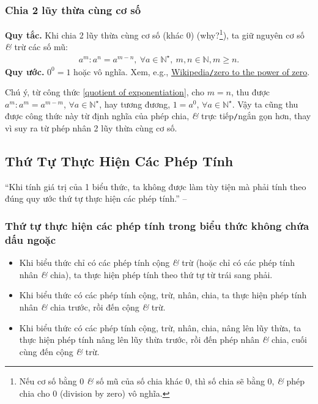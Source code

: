 \documentclass{article}
\numberwithin{equation}{section}
\begin{document}
\subsubsection{Chia 2 lũy thừa cùng cơ số}
\textbf{Quy tắc.} Khi chia 2 lũy thừa cùng cơ số (khác $0$) (why?\footnote{Nếu cơ số bằng 0 \textit{\&} số mũ của số chia khác 0, thì số chia sẽ bằng 0, \textit{\&} phép chia cho 0 (division by zero) vô nghĩa.}), ta giữ nguyên cơ số \textit{\&} trừ các số mũ:
\begin{align}
	\label{quotient of exponentiation}
	\boxed{a^m:a^n = a^{m-n},\ \forall a\in\mathbb{N}^\star,\ m,n\in\mathbb{N},m\ge n.}
\end{align}
\textbf{Quy ước.} $0^0 = 1$ hoặc vô nghĩa. Xem, e.g., \href{https://en.wikipedia.org/wiki/Zero_to_the_power_of_zero}{Wikipedia\texttt{/}zero to the power of zero}.

Chú ý, từ công thức \eqref{quotient of exponentiation}, cho $m = n$, thu được $a^m:a^m = a^{m - m}$, $\forall a\in\mathbb{N}^\star$, hay tương đương, $1 = a^0$, $\forall a\in\mathbb{N}^\star$. Vậy ta cũng thu được công thức này từ định nghĩa của phép chia, \textit{\&} trực tiếp\texttt{/}ngắn gọn hơn, thay vì suy ra từ phép nhân 2 lũy thừa cùng cơ số.

\subsection{Thứ Tự Thực Hiện Các Phép Tính}
``Khi tính giá trị của 1 biểu thức, ta không được làm tùy tiện mà phải tính theo đúng quy ước thứ tự thực hiện các phép tính.'' -- \cite[p. 26]{Thai_Anh_Dat_Ha_Loan_Nam_Quang_Toan_6_tap_2}

\subsubsection{Thứ tự thực hiện các phép tính trong biểu thức không chứa dấu ngoặc}
\begin{tcolorbox}
	\begin{itemize}
		\item Khi biểu thức chỉ có các phép tính cộng \textit{\&} trừ (hoặc chỉ có các phép tính nhân \textit{\&} chia), ta thực hiện phép tính theo thứ tự từ trái sang phải.
		\item Khi biểu thức có các phép tính cộng, trừ, nhân, chia, ta thực hiện phép tính nhân \textit{\&} chia trước, rồi đến cộng \textit{\&} trừ.
		\item Khi biểu thức có các phép tính cộng, trừ, nhân, chia, nâng lên lũy thừa, ta thực hiện phép tính nâng lên lũy thừa trước, rồi đến phép nhân \textit{\&} chia, cuối cùng đến cộng \textit{\&} trừ.
	\end{itemize}
\end{tcolorbox}
\end{document}
